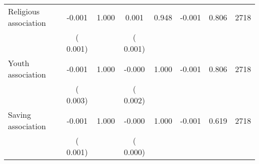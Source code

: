 \begin{tabular}{l*{7}{c}}
 Religious association       &             -0.001       &        1.000  &              0.001       &        0.948  &             -0.001       &              0.806 &  2718 \\ 
                       &       (       0.001)             &                               &       (       0.001)                     &                               &                                               &                                &                      \\ 

 Youth association       &             -0.001       &        1.000  &             -0.000       &        1.000  &             -0.001       &              0.806 &  2718 \\ 
                       &       (       0.003)             &                               &       (       0.002)                     &                               &                                               &                                &                      \\ 

 Saving association       &             -0.001       &        1.000  &             -0.000       &        1.000  &             -0.001       &              0.619 &  2718 \\ 
                       &       (       0.001)             &                               &       (       0.000)                     &                               &                                               &                                &                      \\ 

\hline \end{tabular}